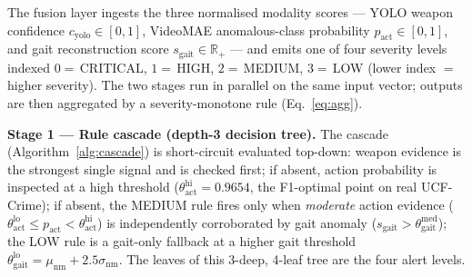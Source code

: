 \documentclass[runningheads]{llncs}
\begin{document}
The fusion layer ingests the three normalised modality scores --- YOLO weapon confidence $c_\text{yolo}\in[0,1]$, VideoMAE anomalous-class probability $p_\text{act}\in[0,1]$, and gait reconstruction score $s_\text{gait}\in\mathbb{R}_+$ --- and emits one of four severity levels indexed $0=$\,CRITICAL, $1=$\,HIGH, $2=$\,MEDIUM, $3=$\,LOW (lower index $=$ higher severity). The two stages run in parallel on the same input vector; outputs are then aggregated by a severity-monotone rule (Eq.~\ref{eq:agg}).

\textbf{Stage 1 --- Rule cascade (depth-3 decision tree).} The cascade (Algorithm~\ref{alg:cascade}) is short-circuit evaluated top-down: weapon evidence is the strongest single signal and is checked first; if absent, action probability is inspected at a high threshold ($\theta_\text{act}^\text{hi} = 0.9654$, the F1-optimal point on real UCF-Crime); if absent, the MEDIUM rule fires only when \emph{moderate} action evidence ($\theta_\text{act}^\text{lo} \leq p_\text{act} < \theta_\text{act}^\text{hi}$) is independently corroborated by gait anomaly ($s_\text{gait} > \theta_\text{gait}^\text{med}$); the LOW rule is a gait-only fallback at a higher gait threshold $\theta_\text{gait}^\text{lo} = \mu_\text{nm} + 2.5\sigma_\text{nm}$. The leaves of this 3-deep, 4-leaf tree are the four alert levels.
\end{document}
